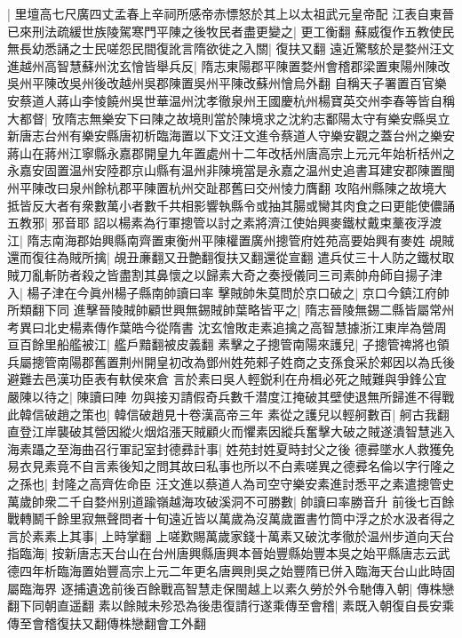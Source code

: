 |{
	里壇高七尺廣四丈孟春上辛祠所感帝赤慓怒於其上以太祖武元皇帝配}
江表自東晉已來刑法疏緩世族陵駕寒門平陳之後牧民者盡更變之|{
	更工衡翻}
蘇威復作五教使民無長幼悉誦之士民嗟怨民間復訛言隋欲徙之入關|{
	復扶又翻}
遠近驚駭於是婺州汪文進越州高智慧蘇州沈玄懀皆舉兵反|{
	隋志東陽郡平陳置婺州會稽郡梁置東陽州陳改吳州平陳改吳州後改越州吳郡陳置吳州平陳改蘇州懀烏外翻}
自稱天子署置百官樂安蔡道人蔣山李㥄饒州吳世華温州沈孝徹泉州王國慶杭州楊寶英交州李春等皆自稱大都督|{
	攷隋志無樂安下曰陳之故境則當於陳境求之沈約志鄱陽太守有樂安縣吳立新唐志台州有樂安縣唐初析臨海置以下文汪文進令蔡道人守樂安觀之蓋台州之樂安蔣山在蔣州江寧縣永嘉郡開皇九年置處州十二年改栝州唐高宗上元元年始析栝州之永嘉安固置温州安陸郡京山縣有温州非陳境當是永嘉之温州史追書耳建安郡陳置閩州平陳改曰泉州餘杭郡平陳置杭州交趾郡舊曰交州㥄力膺翻}
攻陷州縣陳之故境大抵皆反大者有衆數萬小者數千共相影響執縣令或抽其腸或臠其肉食之曰更能使儂誦五教邪|{
	邪音耶}
詔以楊素為行軍摠管以討之素將濟江使始興麥鐵杖戴束藳夜浮渡江|{
	隋志南海郡始興縣南齊置東衡州平陳權置廣州摠管府姓苑高要始興有麥姓}
覘賊還而復往為賊所擒|{
	覘丑亷翻又丑艶翻復扶又翻還從宣翻}
遣兵仗三十人防之鐵杖取賊刀亂斬防者殺之皆盡割其鼻懷之以歸素大奇之奏授儀同三司素帥舟師自揚子津入|{
	楊子津在今眞州楊子縣南帥讀曰率}
擊賊帥朱莫問於京口破之|{
	京口今鎮江府帥所類翻下同}
進擊晉陵賊帥顧世興無錫賊帥葉略皆平之|{
	隋志晉陵無錫二縣皆屬常州　考異曰北史楊素傳作葉皓今從隋書}
沈玄懀敗走素追擒之高智慧據浙江東岸為營周亘百餘里船艦被江|{
	艦戶黯翻被皮義翻}
素擊之子摠管南陽來護兒|{
	子摠管禆將也領兵屬摠管南陽郡舊置荆州開皇初改為鄧州姓苑郲子姓商之支孫食采於郲因以為氏後避難去邑漢功臣表有軑侯來倉}
言於素曰吳人輕鋭利在舟楫必死之賊難與爭鋒公宜嚴陳以待之|{
	陳讀曰陣}
勿與接刃請假奇兵數千潜度江掩破其壁使退無所歸進不得戰此韓信破趙之策也|{
	韓信破趙見十卷漢高帝三年}
素從之護兒以輕舸數百|{
	舸古我翻}
直登江岸襲破其營因縱火烟焰漲天賊顧火而懼素因縱兵奮擊大破之賊遂潰智慧逃入海素躡之至海曲召行軍記室封德彞計事|{
	姓苑封姓夏時封父之後}
德彛墜水人救獲免易衣見素竟不自言素後知之問其故曰私事也所以不白素嗟異之德彛名倫以字行隆之之孫也|{
	封隆之高齊佐命臣}
汪文進以蔡道人為司空守樂安素進討悉平之素遣摠管史萬歲帥衆二千自婺州别道踰嶺越海攻破溪洞不可勝數|{
	帥讀曰率勝音升}
前後七百餘戰轉鬭千餘里寂無聲問者十旬遠近皆以萬歲為沒萬歲置書竹筒中浮之於水汲者得之言於素素上其事|{
	上時掌翻}
上嗟歎賜萬歲家錢十萬素又破沈孝徹於温州步道向天台指臨海|{
	按新唐志天台山在台州唐興縣唐興本晉始豐縣始豐本吳之始平縣唐志云武德四年析臨海置始豐高宗上元二年更名唐興則吳之始豐隋已併入臨海天台山此時固屬臨海界}
逐捕遺逸前後百餘戰高智慧走保閩越上以素久勞於外令馳傳入朝|{
	傳株戀翻下同朝直遥翻}
素以餘賊未殄恐為後患復請行遂乘傳至會稽|{
	素既入朝復自長安乘傳至會稽復扶又翻傳株戀翻會工外翻}
